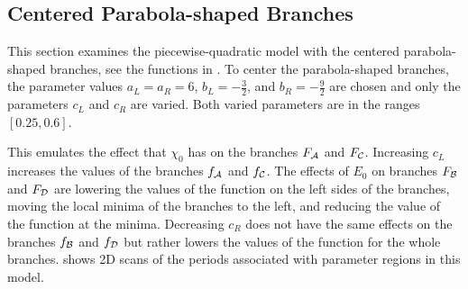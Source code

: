 \subsection{Centered Parabola-shaped Branches}
\label{sec:setup.quad.even}

This section examines the piecewise-quadratic model with the centered parabola-shaped branches, see the functions in .
To center the parabola-shaped branches, the parameter values $a_L = a_R = 6$, $b_L = -\frac{3}{2}$, and $b_R = -\frac{9}{2}$ are chosen and only the parameters $c_L$ and $c_R$ are varied.
Both varied parameters are in the ranges $[0.25, 0.6]$.

This emulates the effect that $\chi_0$ has on the branches $F_{\mathcal{A}}$ and $F_{\mathcal{C}}$.
Increasing $c_L$ increases the values of the branches $f_{\mathcal{A}}$ and $f_{\mathcal{C}}$.
The effects of $E_0$ on branches $F_{\mathcal{B}}$ and $F_{\mathcal{D}}$ are lowering the values of the function on the left sides of the branches, moving the local minima of the branches to the left, and reducing the value of the function at the minima.
Decreasing $c_R$ does not have the same effects on the branches $f_{\mathcal{B}}$ and $f_{\mathcal{D}}$ but rather lowers the values of the function for the whole branches.
 shows 2D scans of the periods associated with parameter regions in this model.

